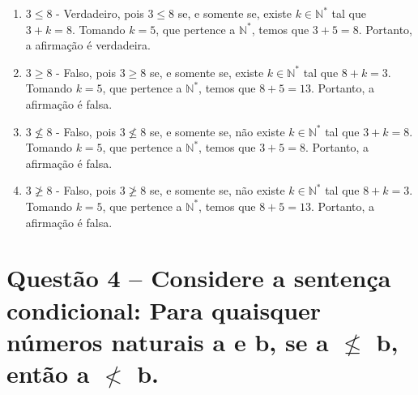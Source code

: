 \documentclass[12pt,a4paper]{article}
\begin{document}
    \begin{enumerate}[label= (\alph*)]
        \item $3 \leq 8$ - Verdadeiro, pois $3 \leq 8$ se, e somente se, existe $k \in \mathbb{N}^*$ tal que $3 + k = 8$. 
        Tomando $k = 5$, que pertence a $\mathbb{N}^*$, temos que $3 + 5 = 8$. 
        Portanto, a afirmação é verdadeira.
        
        \item $3 \geq 8$ - Falso, pois $3 \geq 8$ se, e somente se, existe $k \in \mathbb{N}^*$ tal que $8 + k = 3$. 
        Tomando $k = 5$, que pertence a $\mathbb{N}^*$, temos que $8 + 5 = 13$. 
        Portanto, a afirmação é falsa.
        
        \item $3 \nleq 8$ - Falso, pois $3 \nleq 8$ se, e somente se, não existe $k \in \mathbb{N}^*$ tal que $3 + k = 8$. 
        Tomando $k = 5$, que pertence a $\mathbb{N}^*$, temos que $3 + 5 = 8$. 
        Portanto, a afirmação é falsa.
        
        \item $3 \ngeq 8$ - Falso, pois $3 \ngeq 8$ se, e somente se, não existe $k \in \mathbb{N}^*$ tal que $8 + k = 3$. 
        Tomando $k = 5$, que pertence a $\mathbb{N}^*$, temos que $8 + 5 = 13$. 
        Portanto, a afirmação é falsa.
    \end{enumerate}

\section*{Questão 4 -- Considere a sentença condicional: Para quaisquer números naturais a e b, se a $\nleq$ b, então a $\nless$ b.}
\end{document}
